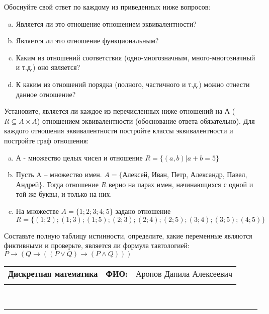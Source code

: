 \documentclass[10pt]{exam}
\newcommand{\class}{Дискретная математика}
\newcommand{\examdate}{}
\begin{document}
\begin{questions}
Обоснуйте свой ответ по каждому из приведенных ниже вопросов:
\begin{enumerate} [a)]\setcounter{enumi}{0}
    \item Является ли это отношение отношением эквивалентности?
    \item Является ли это отношение функциональным?
    \item Каким из отношений соответствия (одно-многозначным, много-многозначный и т.д.) оно является?
    \item К каким из отношений порядка (полного, частичного и т.д.) можно отнести данное отношение?
\end{enumerate}


\question
Установите, является ли каждое из перечисленных ниже отношений на А ($R \subseteq A \times A$) отношением эквивалентности (обоснование ответа обязательно). Для каждого отношения эквивалентности постройте классы 
эквивалентности и постройте граф отношения:
\begin{enumerate} [a)]\setcounter{enumi}{0}
\item А - множество целых чисел и отношение $R = \{(a,b)|a + b = 5\}$
\item Пусть A – множество имен. $A = \{ $Алексей, Иван, Петр, Александр, Павел, Андрей$ \}$. Тогда отношение $R $ верно на парах имен, начинающихся с одной и той же буквы, и только на них.
\item На множестве $A = \{1; 2; 3; 4; 5\}$ задано отношение $R = \{(1; 2); (1; 3); (1; 5); (2; 3); (2; 4); (2; 5); (3; 4); (3; 5); (4; 5)\}$
\end{enumerate}\question Составьте полную таблицу истинности, определите, какие переменные являются фиктивными и проверьте, является ли формула тавтологией:
$ P \rightarrow (Q \rightarrow ((P \lor Q) \rightarrow (P \land Q)))$

\end{questions}
\newpage
\begin{flushright}
\begin{tabular}{p{2.8in} r l}
\textbf{\class} & \textbf{ФИО:} &Аронов Данила Алексеевич
\\

\textbf{\examdate} &&\\
\end{tabular}\\
\end{flushright}
\rule[1ex]{\textwidth}{.1pt}
\end{document}
